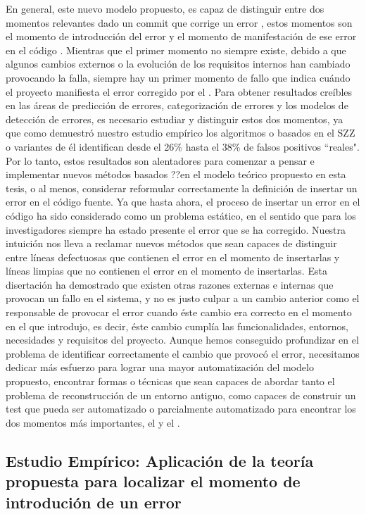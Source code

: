 \documentclass[a4paper, 12pt]{book}
\begin{document}
En general, este nuevo modelo propuesto, es capaz de distinguir entre dos momentos relevantes dado un commit que corrige un error \BFC, estos momentos son el momento de introducci\'on del error \BIC y el momento de manifestaci\'on de ese error en el c\'odigo \FFC. Mientras que el primer momento no siempre existe, debido a que algunos cambios externos o la evoluci\'on de los requisitos internos han cambiado provocando la falla, siempre hay un primer momento de fallo que indica cu\'ando el proyecto manifiesta el error corregido por el \BFC. Para obtener resultados cre\'ibles en las \'areas de predicci\'on de errores, categorizaci\'on de errores y los modelos de detecci\'on de errores, es necesario estudiar y distinguir estos dos momentos, ya que como demuestr\'o nuestro estudio emp\'irico los algoritmos o basados en el SZZ o variantes de \'el identifican desde el 26\% hasta el 38\% de falsos positivos ``reales". Por lo tanto, estos resultados son alentadores para comenzar a pensar e implementar nuevos m\'etodos basados ??en el modelo te\'orico propuesto en esta tesis, o al menos, considerar reformular correctamente la definici\'on de insertar un error en el c\'odigo fuente. Ya que hasta ahora, el proceso de insertar un error en el c\'odigo ha sido considerado como un problema est\'atico, en el sentido que para los investigadores siempre ha estado presente el error que se ha corregido. Nuestra intuici\'on nos lleva a reclamar nuevos m\'etodos que sean capaces de distinguir entre l\'ineas defectuosas que contienen el error en el momento de insertarlas y l\'ineas limpias que no contienen el error en el momento de insertarlas. Esta disertaci\'on ha demostrado que existen otras razones externas e internas que provocan un fallo en el sistema, y no es justo culpar a un cambio anterior como el responsable de provocar el error cuando \'este cambio era correcto en el momento en el que introdujo, es decir, \'este cambio cumpl\'ia las funcionalidades, entornos, necesidades y requisitos del proyecto. Aunque hemos conseguido profundizar en el problema de identificar correctamente el cambio que provoc\'o el error, necesitamos dedicar m\'as esfuerzo para lograr una mayor automatizaci\'on del modelo propuesto, encontrar formas o t\'ecnicas que sean capaces de abordar tanto el problema de reconstrucci\'on de un entorno antiguo, como capaces de construir un test que pueda ser automatizado o parcialmente automatizado para encontrar los dos momentos m\'as importantes, el \BIC y el \FFC.	

\subsection{Estudio Emp\'irico: Aplicaci\'on de la teor\'ia propuesta para localizar el momento de introduci\'on de un error}
\end{document}
